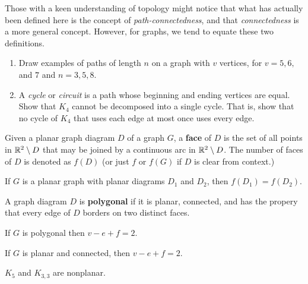 \begin{remark} Those with a keen understanding of topology might notice that what has actually been defined here is the concept of \textit{path-connectedness}, and that \textit{connectedness} is a more general concept.  However, for graphs, we tend to equate these two definitions.
\end{remark}

\begin{examples} \leavevmode
\begin{enumerate}
    \item Draw examples of paths of length $n$ on a graph with $v$ vertices, for $v=5, 6,$ and $7$ and $n = 3, 5, 8$.
    \item A \textit{cycle} or \textit{circuit} is a path whose beginning and ending vertices are equal.  Show that $K_4$ cannot be decomposed into a single cycle.  That is, show that no cycle of $K_4$ that uses each edge at most once uses every edge.
\end{enumerate}
\end{examples}

\begin{definition} Given a planar graph diagram $D$ of a graph $G$, a \textbf{face} of $D$ is the set of all points in $\mathbb{R}^2 \setminus D$ that may be joined by a continuous arc in $\mathbb{R}^2 \setminus D$.  The number of faces of $D$ is denoted as $f(D)$ (or just $f$ or $f(G)$ if $D$ is clear from context.)
\end{definition}

\begin{theorem} If $G$ is a planar graph with planar diagrams $D_1$ and $D_2$, then $f(D_1) = f(D_2)$.
\end{theorem}

\begin{definition} A graph diagram $D$ is \textbf{polygonal} if it is planar, connected, and has the propery that every edge of $D$ borders on two distinct faces.
\end{definition}

\begin{theorem}[Euler] If $G$ is polygonal then $v-e+f = 2$.
\end{theorem}

\begin{corollary} If $G$ is planar and connected, then $v-e+f = 2$.
\end{corollary}

\begin{corollary} $K_5$ and $K_{3,3}$ are nonplanar.
\end{corollary}

